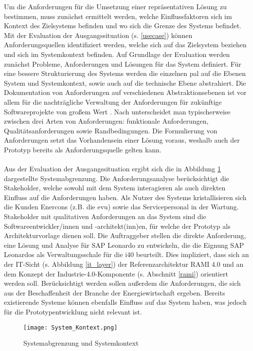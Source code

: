 Um die Anforderungen für die Umsetzung einer repräsentativen Lösung zu bestimmen, muss zunächst ermittelt werden, welche Einflussfaktoren sich im Kontext des Zielsystems befinden und wo sich die Grenze des Systems befindet. Mit der Evaluation der Ausgangssituation (s. \ref{usecase}) können Anforderungsquellen identifiziert werden, welche sich auf das Zielsystem beziehen und sich im Systemkontext befinden. Auf Grundlage der Evaluation werden zunächst Probleme, Anforderungen und Lösungen für das System definiert. Für eine bessere Strukturierung des Systems werden die einzelnen \ac{pal} auf die Ebenen System und Systemkontext, sowie auch auf die technische Ebene abstrahiert. Die Dokumentation von Anforderungen auf verschiedenen Abstraktionsebenen ist vor allem für die nachträgliche Verwaltung der Anforderungen für zukünftige Softwareprojekte von großem Wert \citep{Lauenroth2016}. Nach \citet{IREB2017} unterscheidet man typischerweise zwischen drei Arten von Anforderungen: funktionale Anforderungen, Qualitätsanforderungen sowie Randbedingungen.
Die Formulierung von Anforderungen setzt das Vorhandensein einer Lösung voraus, weshalb auch der Prototyp bereits als Anforderungsquelle gelten kann.
\\\\Aus der Evaluation der Ausgangssituation ergibt sich die in Abbildung \ref{kontext} dargestellte Systemabgrenzung. Die Anforderungsanalyse berücksichtigt die Stakeholder, welche sowohl mit dem System interagieren als auch direkten Einfluss auf die Anforderungen haben. Als Nutzer des Systems kristallisieren sich die Kunden Enercons (z.B. die \ac{evu}) sowie das Servicepersonal in der Wartung. Stakeholder mit qualitativen Anforderungen an das System sind die Softwareentwickler/innen und -architekt(inn)en, für welche der Prototyp als Architekturvorlage dienen soll. Die Auftraggeber stellen die direkte Anforderung, eine Lösung und Analyse für SAP Leonardo zu entwickeln, die die Eignung SAP Leonardos als Verwaltungsschale für die \ac{i40} beurteilt. Dies impliziert, dass sich an der IT-Sicht (s. Abbildung \ref{it_layer}) der Referenzarchitektur RAMI 4.0 und an dem Konzept der Industrie-4.0-Komponente (s. Abschnitt \ref{rami}) orientiert werden soll. Berücksichtigt werden sollen außerdem die Anforderungen, die sich aus der Beschaffenheit der Branche der Energiewirtschaft ergeben. Bereits existierende Systeme können ebenfalls Einfluss auf das System haben, was jedoch für die Prototypentwicklung nicht relevant ist.


\begin{figure}[h]
  \centering
  \texttt{[image: System\_Kontext.png]}
  \caption[Systemabgrenzung und Systemkontext]{Systemabgrenzung und Systemkontext}
  \label{kontext}
\end{figure}


